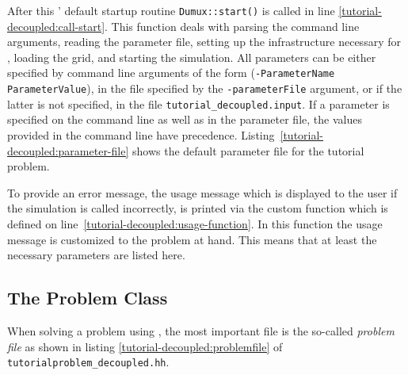 After this \Dumux' default startup routine \texttt{Dumux::start()} is
called in line \ref{tutorial-decoupled:call-start}. This function deals
with parsing the command line arguments, reading the parameter file,
setting up the infrastructure necessary for \Dune, loading the grid, and
starting the simulation. All parameters can
be either specified by command line arguments of the form
(\texttt{-ParameterName ParameterValue}), in the file specified by the
\texttt{-parameterFile} argument, or if the latter is not specified,
in the file \texttt{tutorial\_decoupled.input}. If a parameter is
specified on the command line as well as in the parameter file, the
values provided in the command line have
precedence. Listing~\ref{tutorial-decoupled:parameter-file} shows the
default parameter file for the tutorial problem.

\begin{lst}\label{tutorial-decoupled:parameter-file} \mbox{}

\end{lst}

To provide an error message, the usage message which is displayed to
the user if the simulation is called incorrectly, is printed via the
custom function which is defined on
line~\ref{tutorial-decoupled:usage-function}. In this function the usage
message is customized to the problem at hand. This means that at least
the necessary parameters are listed here.

\subsection{The Problem Class}
\label{decoupled_problem}

When solving a problem using \Dumux, the most important file is the
so-called \textit{problem file} as shown in listing
\ref{tutorial-decoupled:problemfile} of
\texttt{tutorialproblem\_decoupled.hh}.

\begin{lst}\label{tutorial-decoupled:problemfile} \mbox{}

\end{lst}

